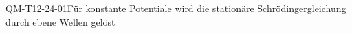 
\begin{REM}{QM-T12-24-01}{Für konstante Potentiale wird die stationäre Schrödingergleichung durch ebene Wellen gelöst}
\end{REM}
